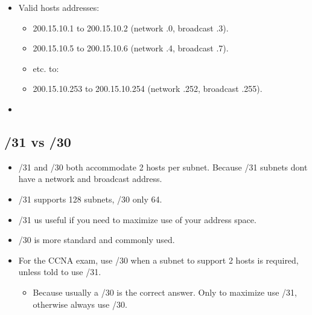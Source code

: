 \begin{itemize}
\begin{itemize}
            \item Valid hosts addresses:
                \begin{itemize}
                    \item 200.15.10.1 to 200.15.10.2 (network .0, broadcast .3).
                    \item 200.15.10.5 to 200.15.10.6 (network .4, broadcast .7).
                    \item etc. to:
                    \item 200.15.10.253 to 200.15.10.254 (network .252, broadcast .255).
                \end{itemize}
            
            \item 
        \end{itemize}
\end{itemize}

\subsection{/31 vs /30}
\begin{itemize}
    \item /31 and /30 both accommodate 2 hosts per subnet. Because /31 subnets dont have a network and broadcast address.
    \item /31 supports 128 subnets, /30 only 64.
    \item /31 us useful if you need to maximize use of your address space.
    \item /30 is more standard and commonly used.
    \item For the CCNA exam, use /30 when a subnet to support 2 hosts is required, unless told to use /31. 
        \begin{itemize}
            \item Because usually a /30 is the correct answer. Only to maximize use /31, otherwise always use /30.
        \end{itemize}
\end{itemize}


